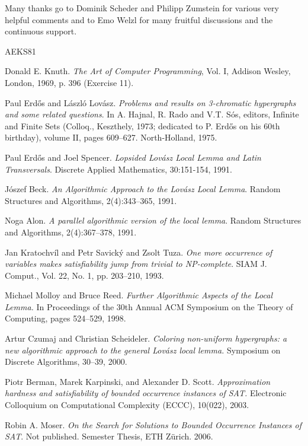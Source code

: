 \documentclass[11pt,a4paper]{article}
\begin{document}
Many thanks go to Dominik Scheder and Philipp Zumstein for various very helpful comments and to Emo Welzl for many fruitful discussions 
and the continuous support.

\begin{thebibliography}{AEKS81}

\small

Donald E. Knuth. 
\emph{The Art of Computer Programming}, Vol. I, Addison Wesley,
London, 1969, p. 396 (Exercise 11).

Paul Erd\H os and L\'aszl\'o Lov\'asz.
\emph{Problems and results on 3-chromatic hypergraphs and some related questions}. 
In A. Hajnal, R. Rado and V.T. S\'os, editors,
Infinite and Finite Sets (Colloq., Keszthely, 1973; dedicated to P.
Erd\H os on his 60th birthday), volume II,
pages 609--627. North-Holland, 1975.

Paul Erd\H os and Joel Spencer.
\emph{Lopsided Lov\'asz Local Lemma and Latin Transversals}.
Discrete Applied Mathematics, 30:151-154, 1991.

J\'oszef Beck.
\emph{An Algorithmic Approach to the Lov\'asz Local Lemma}.
Random Structures and Algorithms, 2(4):343--365, 1991.

Noga Alon. 
\emph{A parallel algorithmic version of the local lemma}.
Random Structures and Algorithms, 2(4):367--378, 1991.

Jan Kratochv\'il and Petr Savick\'y and Zsolt Tuza.
\emph{One more occurrence of variables makes satisfiability jump from trivial to NP-complete}. 
SIAM J. Comput., Vol. 22, No. 1, pp. 203--210, 1993.

Michael Molloy and Bruce Reed.
\emph{Further Algorithmic Aspects of the Local Lemma.} 
In Proceedings of the 30th Annual ACM Symposium on the Theory of Computing, pages 524--529, 1998.

Artur Czumaj and Christian Scheideler. 
\emph{Coloring non-uniform hypergraphs: a new algorithmic approach to the general Lov\'asz local lemma.} 
Symposium on Discrete Algorithms, 30--39, 2000.

Piotr Berman, Marek Karpinski, and Alexander D. Scott.
\emph{Approximation hardness and satisfiability of bounded occurrence instances of SAT.}
Electronic Colloquium on Computational Complexity (ECCC), 10(022), 2003.

Robin A. Moser.
\emph{On the Search for Solutions to Bounded Occurrence Instances of SAT}.
Not published. Semester Thesis, ETH Z\"urich. 2006.


\end{thebibliography}
\end{document}
